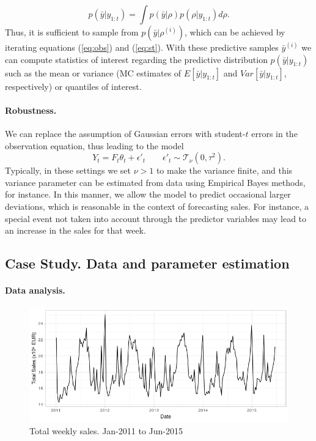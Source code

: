 \[
p(\bar{y} | y_{1:t}) = \int p(\bar{y}| \rho)p(\rho | y_{1:t}) d\rho.
\]
Thus, it is sufficient to sample from $p(\bar{y}| \rho^{(i)})$, which can be achieved by iterating equations (\ref{eq:obs}) and (\ref{eq:st}). With these predictive samples $\bar{y}^{(i)}$ we can compute statistics of interest regarding the predictive distribution   $p(\bar{y} | y_{1:t})$ such as the mean or variance (MC estimates of $E[ \bar{y} | y_{1:t}]$ and $Var[\bar{y} | y_{1:t}]$, respectively) or quantiles of interest.\\


\paragraph{Robustness.}

We can replace the assumption of Gaussian errors with student-$t$ errors in the observation equation, thus leading to the model
$$ 
Y_{t} = F_t \theta_t + \epsilon'_t \qquad \epsilon'_t \sim \mathcal{T}_\nu(0, \tau^2).
$$
Typically, in these settings we set $\nu > 1$ to make the variance finite, and this variance parameter can be estimated from data using Empirical Bayes methods, for instance.
In this manner, we allow the model to predict occasional larger deviations, which is reasonable in the context of forecasting sales. For instance, a special event not taken into account through the predictor variables may lead to an increase in the sales for that week.


\subsection{Case Study. Data and parameter estimation}

\paragraph{Data analysis.}


\begin{figure}[h]
\centering
\includegraphics[scale=0.6]{figures/01_Sales.png}
\caption{Total weekly sales. Jan-2011 to Jun-2015}\label{fig:sales}
\end{figure}



